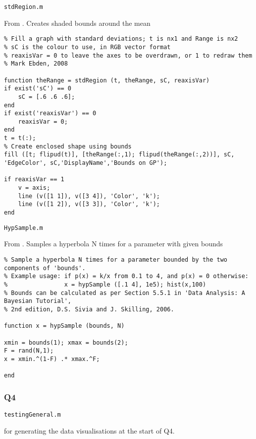 \documentclass{article}
\begin{document}

\texttt{stdRegion.m}

From \cite{ebden2015gp}. Creates shaded bounds around the mean

\begin{lstlisting}
% Fill a graph with standard deviations; t is nx1 and Range is nx2
% sC is the colour to use, in RGB vector format
% reaxisVar = 0 to leave the axes to be overdrawn, or 1 to redraw them
% Mark Ebden, 2008

function theRange = stdRegion (t, theRange, sC, reaxisVar)
if exist('sC') == 0
    sC = [.6 .6 .6];
end
if exist('reaxisVar') == 0
    reaxisVar = 0;
end
t = t(:);
% Create enclosed shape using bounds
fill ([t; flipud(t)], [theRange(:,1); flipud(theRange(:,2))], sC, 'EdgeColor', sC,'DisplayName','Bounds on GP');

if reaxisVar == 1
    v = axis;
    line (v([1 1]), v([3 4]), 'Color', 'k');
    line (v([1 2]), v([3 3]), 'Color', 'k');
end
\end{lstlisting}



\texttt{HypSample.m}

From \cite{sivia2006data}. Samples a hyperbola N times for a parameter with given bounds

\begin{lstlisting}
% Sample a hyperbola N times for a parameter bounded by the two components of 'bounds'.
% Example usage: if p(x) = k/x from 0.1 to 4, and p(x) = 0 otherwise:
%                x = hypSample ([.1 4], 1e5); hist(x,100)
% Bounds can be calculated as per Section 5.5.1 in 'Data Analysis: A Bayesian Tutorial',
% 2nd edition, D.S. Sivia and J. Skilling, 2006.

function x = hypSample (bounds, N)

xmin = bounds(1); xmax = bounds(2);
F = rand(N,1);
x = xmin.^(1-F) .* xmax.^F;

end
\end{lstlisting}


\subsubsection{Q4}

\texttt{testingGeneral.m}

for generating the data visualisations at the start of Q4.
\end{document}
